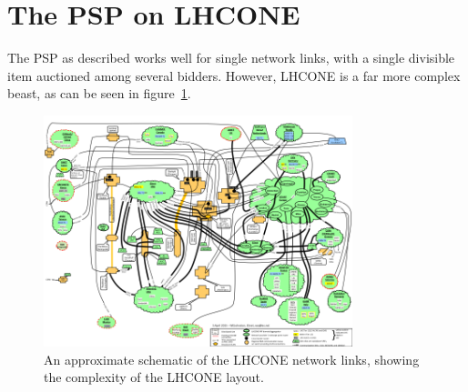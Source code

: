 \section{The PSP on LHCONE}

The PSP as described works well for single network links, with a single divisible item auctioned among several bidders. However, LHCONE is a far more complex beast, as can be seen in figure~\ref{fig:lhcone}.

\begin{figure}[h]
 \centering
   \includegraphics[width=0.8\textwidth]{LHCONE}
       \caption{An approximate schematic of the LHCONE network links, showing the complexity of the LHCONE layout.}
 \label{fig:lhcone}
\end{figure}
